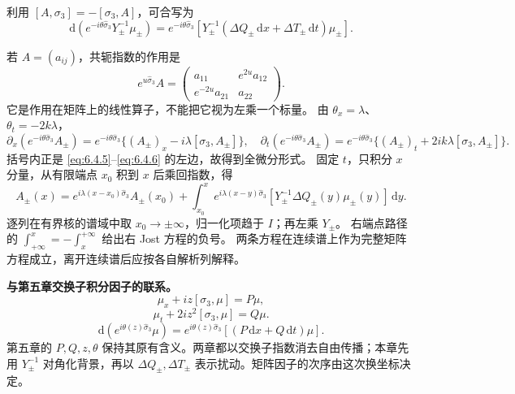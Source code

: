 \documentclass[lang=cn,scheme=chinese,mode=simple,device=normal,color=blue,
math=cm,thmcnt=section,12pt]{elegantbook}
\newcommand{\dd}{\,\mathrm{d}}
\newcommand{\eqq}[2]{\tag{#1}\label{eq:#1}#2}
\begin{document}
利用 $[A,\sigma_3]=-[\sigma_3,A]$，可合写为
\begin{equation}\eqq{6.4.7}{\mathrm{d}(e^{-i\theta\widehat\sigma_3}Y_\pm^{-1}\mu_\pm)
        =e^{-i\theta\widehat\sigma_3}
            [Y_\pm^{-1}(\Delta Q_\pm\,\mathrm{d}x+\Delta T_\pm\,\mathrm{d}t)\mu_\pm].}\end{equation}

\begin{callout}[计算：交换子积分因子及端点积分]
    若 $A=(a_{ij})$，共轭指数的作用是
    \[
        e^{u\widehat\sigma_3}A
        =\begin{pmatrix}a_{11}&e^{2u}a_{12}\\e^{-2u}a_{21}&a_{22}\end{pmatrix}.
    \]
    它是作用在矩阵上的线性算子，不能把它视为左乘一个标量。
    由 $\theta_x=\lambda$、$\theta_t=-2k\lambda$，
    \[
        \partial_x(e^{-i\theta\widehat\sigma_3}A_\pm)
        =e^{-i\theta\widehat\sigma_3}\{(A_\pm)_x-i\lambda[\sigma_3,A_\pm]\},\quad
        \partial_t(e^{-i\theta\widehat\sigma_3}A_\pm)
        =e^{-i\theta\widehat\sigma_3}\{(A_\pm)_t+2ik\lambda[\sigma_3,A_\pm]\}.
    \]
    括号内正是 \eqref{eq:6.4.5}--\eqref{eq:6.4.6} 的左边，故得到全微分形式。
    固定 $t$，只积分 $x$ 分量，从有限端点 $x_0$ 积到 $x$ 后乘回指数，得
    \[
        A_\pm(x)=e^{i\lambda(x-x_0)\widehat\sigma_3}A_\pm(x_0)
        +\int_{x_0}^x e^{i\lambda(x-y)\widehat\sigma_3}
            [Y_\pm^{-1}\Delta Q_\pm(y)\mu_\pm(y)]\dd y.
    \]
    逐列在有界核的谱域中取 $x_0\to\pm\infty$，归一化项趋于 $I$；再左乘 $Y_\pm$。
    右端点路径的 $\displaystyle \int_{+\infty}^x=-\int_x^{+\infty}$ 给出右 Jost 方程的负号。
    两条方程在连续谱上作为完整矩阵方程成立，离开连续谱后应按各自解析列解释。
\end{callout}

\begin{remark}\quad\textbf{与第五章交换子积分因子的联系。}
    \begin{equation}
        \mu_x+iz[\sigma_3,\mu]=P\mu,
        \tag{5.1.7}
    \end{equation}
    \begin{equation}
        \mu_t+2iz^2[\sigma_3,\mu]=Q\mu.
        \tag{5.1.8}
    \end{equation}
    \begin{equation}
        \mathrm d\!\left(e^{i\theta(z)\widehat{\sigma}_3}\mu\right)
        =
        e^{i\theta(z)\widehat{\sigma}_3}
        \left[(P\,\mathrm dx+Q\,\mathrm dt)\mu\right].
        \tag{5.1.9}
    \end{equation}
    第五章的 $P,Q,z,\theta$ 保持其原有含义。两章都以交换子指数消去自由传播；本章先用 $Y_\pm^{-1}$ 对角化背景，再以 $\Delta Q_\pm,\Delta T_\pm$ 表示扰动。矩阵因子的次序由这次换坐标决定。
\end{remark}
\end{document}
